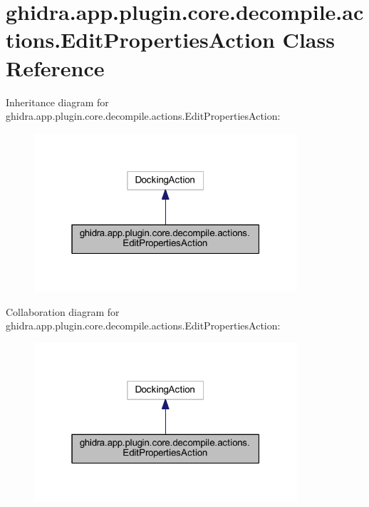 \hypertarget{classghidra_1_1app_1_1plugin_1_1core_1_1decompile_1_1actions_1_1_edit_properties_action}{}\section{ghidra.\+app.\+plugin.\+core.\+decompile.\+actions.\+Edit\+Properties\+Action Class Reference}
\label{classghidra_1_1app_1_1plugin_1_1core_1_1decompile_1_1actions_1_1_edit_properties_action}


Inheritance diagram for ghidra.\+app.\+plugin.\+core.\+decompile.\+actions.\+Edit\+Properties\+Action\+:
\nopagebreak
\begin{figure}[H]
\begin{center}
\leavevmode
\includegraphics[width=277pt]{classghidra_1_1app_1_1plugin_1_1core_1_1decompile_1_1actions_1_1_edit_properties_action__inherit__graph}
\end{center}
\end{figure}


Collaboration diagram for ghidra.\+app.\+plugin.\+core.\+decompile.\+actions.\+Edit\+Properties\+Action\+:
\nopagebreak
\begin{figure}[H]
\begin{center}
\leavevmode
\includegraphics[width=277pt]{classghidra_1_1app_1_1plugin_1_1core_1_1decompile_1_1actions_1_1_edit_properties_action__coll__graph}
\end{center}
\end{figure}
